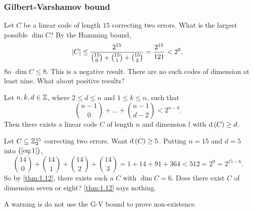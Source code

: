 \pagebreak

\subsubsection{Gilbert-Varshamov bound}

\begin{example*}
Let $ C $ be a linear code of length $ 15 $ correcting two errors. What is the largest possible $ \dim C $? By the Hamming bound,
$$ \abs{C} \le \dfrac{2^{15}}{\binom{15}{0} + \binom{15}{1} + \binom{15}{2}} = \dfrac{2^{15}}{121} < 2^9. $$
So $ \dim C \le 8 $. This is a negative result. There are no such codes of dimension at least nine. What about positive results?
\end{example*}

\begin{theorem}[G-V bound]
\label{thm:1.12}
Let $ n, k, d \in \mathbb{Z} $, where $ 2 \le d \le n $ and $ 1 \le k \le n $, such that
\begin{equation}
\label{eq:1}
\binom{n - 1}{0} + \dots + \binom{n - 1}{d - 2} < 2^{n - k}.
\end{equation}
Then there exists a linear code $ C $ of length $ n $ and dimension $ l $ with $ \d\br{C} \ge d $.
\end{theorem}

\begin{example*}
Let $ C \subseteq \mathbb{Z}_2^{15} $ correcting two errors. Want $ \d\br{C} \ge 5 $. Putting $ n = 15 $ and $ d = 5 $ into $ \br{\ref{eq:1}} $,
$$ \binom{14}{0} + \binom{14}{1} + \binom{14}{2} + \binom{14}{3} = 1 + 14 + 91 + 364 < 512 = 2^9 = 2^{15 - 6}. $$
So by \ref{thm:1.12}, there exists such a $ C $ with $ \dim C = 6 $. Does there exist $ C $ of dimension seven or eight? \ref{thm:1.12} says nothing.
\end{example*}

A warning is do not use the G-V bound to prove non-existence.

